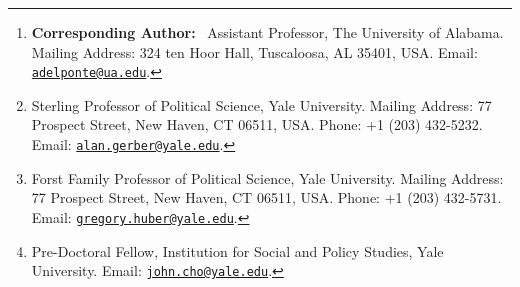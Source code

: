 \blind
\title{\tit}

\author{Alessandro Del Ponte\thanks{\textbf{Corresponding Author:
}~Assistant Professor, The University of Alabama. Mailing Address: 324 ten Hoor Hall, Tuscaloosa, AL 35401, USA.
Email: \href{mailto:
adelponte@ua.edu}{\texttt{adelponte@ua.edu}}.}
\and Alan S. Gerber\thanks{Sterling Professor of Political Science, Yale
University. Mailing Address: 77 Prospect Street, New Haven, CT 06511, USA. Phone:
+1 (203) 432-5232. Email: \href{mailto: alan.gerber@yale.edu}{\texttt{alan.gerber@yale.edu}}.} 
\and Gregory A. Huber\thanks{Forst Family Professor of Political Science, Yale University. Mailing Address:
77 Prospect Street, New Haven, CT 06511, USA. Phone: +1 (203) 432-5731. Email:
\href{mailto: gregory.huber@yale.edu}{\texttt{gregory.huber@yale.edu}}.} 
\and John J. Cho\thanks{Pre-Doctoral Fellow, Institution for Social and Policy Studies, Yale
University. Email: \href{mailto: john.cho@yale.edu}{\texttt{john.cho@yale.edu}}.
}}

\date{\da}
\maketitle
\fi

\blind
\title{\tit}
\date{\da} 
\maketitle
\fi

\thispagestyle{empty}

\blind
\newpage{}
\thispagestyle{empty}
\fi